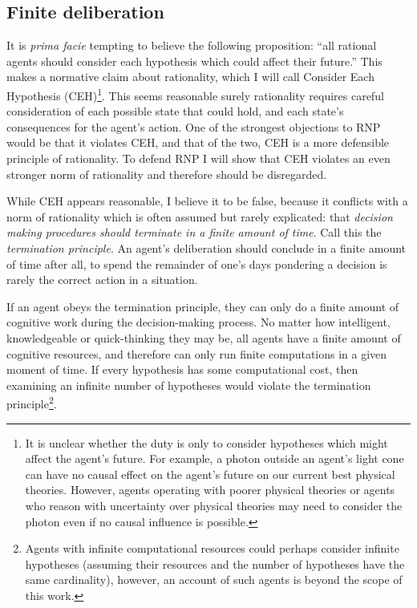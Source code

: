 \documentclass{article}
\begin{document}
\subsection{Finite deliberation}

It is \textit{prima facie} tempting to believe the following proposition: ``all rational agents should consider each hypothesis which could affect their future.'' This makes a normative claim about rationality, which I will call Consider Each Hypothesis (CEH)\footnote{It is unclear whether the duty is only to consider hypotheses which might affect the agent's future. For example, a photon outside an agent's light cone can have no causal effect on the agent's future on our current best physical theories. However, agents operating with poorer physical theories \textemdash{} or agents who reason with uncertainty over physical theories \textemdash{} may need to consider the photon even if no causal influence is possible.}. This seems reasonable \textemdash{} surely rationality requires careful consideration of each possible state that could hold, and each state's consequences for the agent's action. One of the strongest objections to RNP would be that it violates CEH, and that of the two, CEH is a more defensible principle of rationality. To defend RNP I will show that CEH violates an even stronger norm of rationality and therefore should be disregarded.

While CEH appears reasonable, I believe it to be false, because it conflicts with a norm of rationality which is often assumed but rarely explicated: that \textit{decision making procedures should terminate in a finite amount of time}. Call this the \textit{termination principle}. An agent's deliberation should conclude in a finite amount of time \textemdash{} after all, to spend the remainder of one's days pondering a decision is rarely the correct action in a situation. 

If an agent obeys the termination principle, they can only do a finite amount of cognitive work during the decision-making process. No matter how intelligent, knowledgeable or quick-thinking they may be, all agents have a finite amount of cognitive resources, and therefore can only run finite computations in a given moment of time. If every hypothesis has some computational cost, then examining an infinite number of hypotheses would violate the termination principle\footnote{Agents with infinite computational resources could perhaps consider infinite hypotheses (assuming their resources and the number of hypotheses have the same cardinality), however, an account of such agents is beyond the scope of this work.}. 
\end{document}
